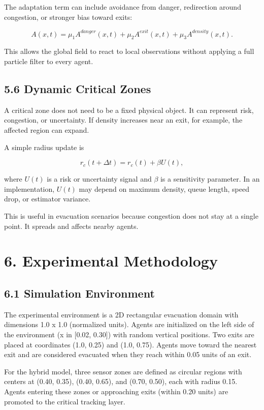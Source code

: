 \documentclass[
  11pt,
]{article}
\begin{document}
The adaptation term can include avoidance from danger, redirection
around congestion, or stronger bias toward exits:

\[
A(x,t)
=
\mu_1 A^{danger}(x,t)
+
\mu_2 A^{exit}(x,t)
+
\mu_3 A^{density}(x,t).
\]

This allows the global field to react to local observations without
applying a full particle filter to every agent.

\subsection{5.6 Dynamic Critical Zones}\label{dynamic-critical-zones}

A critical zone does not need to be a fixed physical object. It can
represent risk, congestion, or uncertainty. If density increases near an
exit, for example, the affected region can expand.

A simple radius update is

\[
r_c(t+\Delta t)
=
r_c(t)
+
\beta U(t),
\]

where \(U(t)\) is a risk or uncertainty signal and \(\beta\) is a
sensitivity parameter. In an implementation, \(U(t)\) may depend on
maximum density, queue length, speed drop, or estimator variance.

This is useful in evacuation scenarios because congestion does not stay
at a single point. It spreads and affects nearby agents.

\section{6. Experimental Methodology}\label{experimental-methodology}

\subsection{6.1 Simulation Environment}\label{simulation-environment}

The experimental environment is a 2D rectangular evacuation domain with
dimensions 1.0 x 1.0 (normalized units). Agents are initialized on the
left side of the environment (x in {[}0.02, 0.30{]}) with random
vertical positions. Two exits are placed at coordinates (1.0, 0.25) and
(1.0, 0.75). Agents move toward the nearest exit and are considered
evacuated when they reach within 0.05 units of an exit.

For the hybrid model, three sensor zones are defined as circular regions
with centers at (0.40, 0.35), (0.40, 0.65), and (0.70, 0.50), each with
radius 0.15. Agents entering these zones or approaching exits (within
0.20 units) are promoted to the critical tracking layer.
\end{document}
